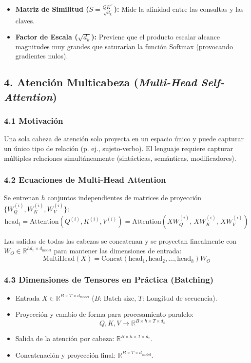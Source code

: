 \begin{itemize}
	\item \textbf{Matriz de Similitud ($S = \frac{Q K^\top}{\sqrt{d_k}}$):} Mide la afinidad entre las consultas y las claves.
	\item \textbf{Factor de Escala ($\sqrt{d_k}$):} Previene que el producto escalar alcance magnitudes muy grandes que saturarían la función Softmax (provocando gradientes nulos).
\end{itemize}

\subsection{4. Atención Multicabeza (\emph{Multi-Head Self-Attention})}

\subsubsection{4.1 Motivación}

Una sola cabeza de atención solo proyecta en un espacio único y puede capturar un único tipo de relación (p. ej., sujeto-verbo). El lenguaje requiere capturar múltiples relaciones simultáneamente (sintácticas, semánticas, modificadores).

\subsubsection{4.2 Ecuaciones de Multi-Head Attention}

Se entrenan $h$ conjuntos independientes de matrices de proyección $\{W_Q^{(i)}, W_K^{(i)}, W_V^{(i)}\}$:
$$\text{head}_i = \text{Attention}\left(Q^{(i)}, K^{(i)}, V^{(i)}\right) = \text{Attention}\left(X W_Q^{(i)}, \, X W_K^{(i)}, \, X W_V^{(i)}\right)$$

Las salidas de todas las cabezas se concatenan y se proyectan linealmente con $W_O \in \mathbb{R}^{h d_v \times d_{\text{model}}}$ para mantener las dimensiones de entrada:
$$\text{MultiHead}(X) = \text{Concat}(\text{head}_1, \text{head}_2, \dots, \text{head}_h) W_O$$

\subsubsection{4.3 Dimensiones de Tensores en Práctica (Batching)}

\begin{itemize}
	\item Entrada $X \in \mathbb{R}^{B \times T \times d_{\text{model}}}$ ($B$: Batch size, $T$: Longitud de secuencia).
	\item Proyección y cambio de forma para procesamiento paralelo:
	$$Q, K, V \rightarrow \mathbb{R}^{B \times h \times T \times d_k}$$
	\item Salida de la atención por cabeza: $\mathbb{R}^{B \times h \times T \times d_v}$.
	\item Concatenación y proyección final: $\mathbb{R}^{B \times T \times d_{\text{model}}}$.
\end{itemize}


